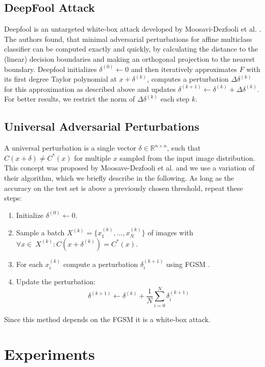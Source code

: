 \documentclass{article}
\begin{document}
\subsection{DeepFool Attack}
Deepfool is an untargeted white-box attack developed by
Moosavi-Dezfooli et al. .  The authors found, that
minimal adversarial perturbations for affine multiclass classifier can
be computed exactly and quickly, by calculating the distance to the
(linear) decision boundaries and making an orthogonal projection to
the nearest boundary.  Deepfool initializes $\delta^{(0)} \gets 0$ and then
iteratively approximates $F$ with its first degree Taylor polynomial
at $x + \delta^{(k)}$, computes a perturbation $\Delta \delta^{(k)}$
for this approximation as described above and updates
$\delta^{(k+1)} \gets \delta^{(k)} + \Delta \delta^{(k)} $.  For
better results, we restrict the norm of $\Delta \delta^{(k)} $ each
step $k$.

\subsection{Universal Adversarial Perturbations}
\label{sec:universal}
A universal perturbation is a single vector $\delta \in \mathbb{R}^{n\times n}$, such that $C(x + \delta) \neq C^*(x)$ for multiple $x$ sampled from the input image distribution. This concept was proposed by Moosave-Dezfooli et al.  and we use a variation of their algorithm, which we briefly describe in the following. As long as the accuracy on the test set is above a previously chosen threshold, repeat these steps:
\begin{enumerate}
	\item Initialize $\delta^{(0)} \gets 0$.
	\item Sample a batch $X^{(k)} = \{x_1^{(k)}, ..., x_N^{(k)}\}$ of images with $\forall x \in\ X^{(k)}:  C(x + \delta^{(k)}) = C^*(x)$.
	\item For each $x_i^{(k)}$ compute a perturbation $\delta_i^{(k+1)}$ using FGSM \cite{fgsm}.
	\item Update the perturbation: $$\delta^{(k+1)} \gets \delta^{(k)} + \frac{1}{N} \sum\limits_{i=0}^N \delta_i^{(k+1)}$$
\end{enumerate}
Since this method depends on the FGSM it is a white-box attack.


\section{Experiments}
\label{lab:experiments}
\end{document}
